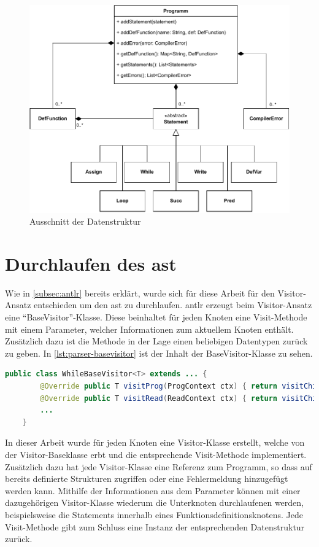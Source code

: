 \begin{figure}[h!]
	\centering
	\includegraphics[width=13cm]{content/pictures/ClassDia.pdf}
	\caption{Ausschnitt der Datenstruktur}
	\label{pic:Semantic-Struct}
\end{figure}

\section{Durchlaufen des \acl{ast}}
Wie in \cref{subsec:antlr} bereits erklärt, wurde sich für diese Arbeit für den Visitor-Ansatz entschieden um den \ac{ast} zu durchlaufen. \ac{antlr} erzeugt beim Visitor-Ansatz eine \enquote{BaseVisitor}-Klasse. Diese beinhaltet für jeden Knoten eine Visit-Methode mit einem Parameter, welcher Informationen zum aktuellem Knoten enthält. Zusätzlich dazu ist die Methode in der Lage einen beliebigen Datentypen zurück zu geben. In \cref{lst:parser-basevisitor} ist der Inhalt der BaseVisitor-Klasse zu sehen.

\begin{lstlisting}[language=java, caption=Inhalt der generierten BaseVisitor-Klasse, label={lst:parser-basevisitor}]
	public class WhileBaseVisitor<T> extends ... {
		@Override public T visitProg(ProgContext ctx) { return visitChildren(ctx); }
		@Override public T visitRead(ReadContext ctx) { return visitChildren(ctx); }
		...
	}
\end{lstlisting}

In dieser Arbeit wurde für jeden Knoten eine Visitor-Klasse erstellt, welche von der Visitor-Baseklasse erbt und die entsprechende Visit-Methode implementiert. Zusätzlich dazu hat jede Visitor-Klasse eine Referenz zum Programm, so dass auf bereits definierte Strukturen zugriffen oder eine Fehlermeldung hinzugefügt werden kann. Mithilfe der Informationen aus dem Parameter können mit einer dazugehörigen Visitor-Klasse wiederum die Unterknoten durchlaufenen werden, beispielsweise die Statements innerhalb eines Funktionsdefinitionsknotens. Jede Visit-Methode gibt zum Schluss eine Instanz der entsprechenden Datenstruktur zurück.

